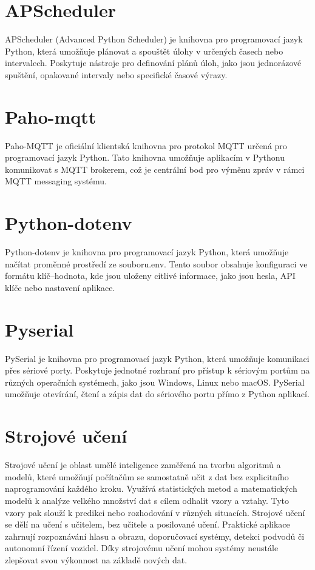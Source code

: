 \section{APScheduler}\label{sec:apscheduler}
APScheduler (Advanced Python Scheduler) je knihovna pro programovací jazyk Python, která umožňuje plánovat a spouštět úlohy v určených časech nebo intervalech.
Poskytuje nástroje pro definování plánů úloh, jako jsou jednorázové spuštění, opakované intervaly nebo specifické časové výrazy.


\section{Paho-mqtt}\label{sec:paho-mqtt}
Paho-MQTT je oficiální klientská knihovna pro protokol MQTT určená pro programovací jazyk Python.
Tato knihovna umožňuje aplikacím v Pythonu komunikovat s MQTT brokerem, což je centrální bod pro výměnu zpráv v rámci MQTT messaging systému.


\section{Python-dotenv}\label{sec:python-dotenv}
Python-dotenv je knihovna pro programovací jazyk Python, která umožňuje načítat proměnné prostředí ze souboru.env.
Tento soubor obsahuje konfiguraci ve formátu klíč–hodnota, kde jsou uloženy citlivé informace, jako jsou hesla, API klíče nebo nastavení aplikace.


\section{Pyserial}\label{sec:pyserial}
PySerial je knihovna pro programovací jazyk Python, která umožňuje komunikaci přes sériové porty. Poskytuje jednotné rozhraní pro přístup k sériovým portům na různých operačních systémech, jako jsou Windows, Linux nebo macOS. PySerial umožňuje otevírání, čtení a zápis dat do sériového portu přímo z Python aplikací.


\section{Strojové učení}\label{sec:ml}
Strojové učení je oblast umělé inteligence zaměřená na tvorbu algoritmů a modelů, které umožňují počítačům se samostatně učit z dat bez explicitního naprogramování každého kroku. Využívá statistických metod a matematických modelů k analýze velkého množství dat s cílem odhalit vzory a vztahy. Tyto vzory pak slouží k predikci nebo rozhodování v různých situacích. Strojové učení se dělí na učení s učitelem, bez učitele a posilované učení. Praktické aplikace zahrnují rozpoznávání hlasu a obrazu, doporučovací systémy, detekci podvodů či autonomní řízení vozidel. Díky strojovému učení mohou systémy neustále zlepšovat svou výkonnost na základě nových dat.


